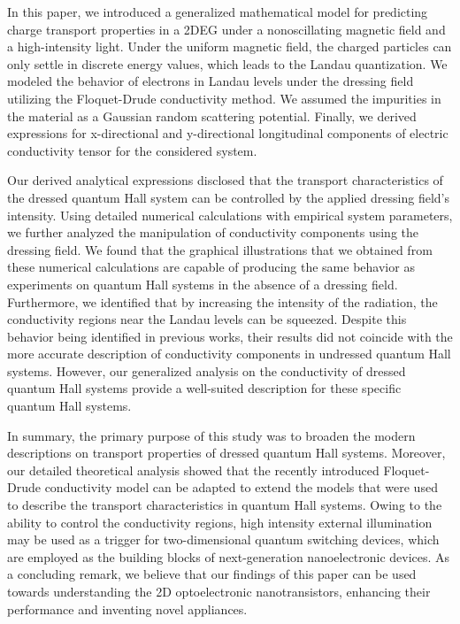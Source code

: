 In this paper, we introduced a generalized mathematical model for predicting  charge transport properties in a 2DEG under a nonoscillating magnetic field and a high-intensity light. Under the uniform magnetic field, the charged particles can only settle in discrete energy values, which leads to the Landau quantization. We modeled the behavior of electrons in Landau levels under the dressing field utilizing the Floquet-Drude conductivity method. We assumed the impurities in the material as a Gaussian random scattering potential. Finally, we derived expressions for x-directional and y-directional longitudinal components of electric conductivity tensor for the considered system.

Our derived analytical expressions disclosed that the transport characteristics of the dressed quantum Hall system can be controlled by the applied dressing field’s intensity. Using detailed numerical calculations with empirical system parameters, we further analyzed the manipulation of conductivity components using the dressing field.
We found that the graphical illustrations that we obtained from these numerical calculations are capable of producing the same behavior as experiments on quantum Hall systems in the absence of a dressing field.
Furthermore, we identified that by increasing the intensity of the radiation, the conductivity regions near the Landau levels can be squeezed. Despite this behavior being identified in previous works, their results did not coincide with the more accurate description of conductivity components in undressed quantum Hall systems. However, our generalized analysis on the conductivity of dressed quantum Hall systems provide a well-suited description for these specific quantum Hall systems.

In summary, the primary purpose of this study was to broaden the modern descriptions on transport properties of dressed quantum Hall systems. Moreover, our detailed theoretical analysis showed that the recently introduced Floquet-Drude conductivity model can be adapted to extend the models that were used to describe the transport characteristics in quantum Hall systems. Owing to the ability to control the conductivity regions, high intensity external illumination may be used as a trigger for two-dimensional quantum switching devices, which are employed as the building blocks of next-generation nanoelectronic devices. As a concluding remark, we believe that our findings of this paper can be used towards understanding the 2D optoelectronic nanotransistors, enhancing their performance and inventing novel appliances.
